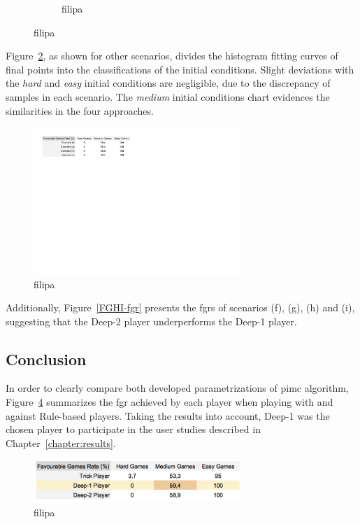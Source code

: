 \begin{figure}[h]
\begin{subfigure}[h]{0.32\textwidth}
                \caption{filipa}
                \label{fig:FGHIeasy}
        \end{subfigure}
        \caption{filipa}
        \label{fig:FGHI-CH}
\end{figure}

Figure~\ref{fig:FGHI-CH}, as shown for other scenarios, divides the histogram fitting curves of final points into the classifications of the initial conditions.
Slight deviations with the \emph{hard} and \emph{easy} initial conditions are negligible, due to the discrepancy of samples in each scenario.
The \emph{medium} initial conditions chart evidences the similarities in the four approaches.

\begin{figure}[h!]
  \centering
    \includegraphics[width=0.7\textwidth]{./img/4/FGHI-fgr}
  \caption{filipa}
\label{fig:FGHI-fgr}
\end{figure}

Additionally, Figure~\ref{FGHI-fgr} presents the \acp{fgr} of scenarios (f), (g), (h) and (i), suggesting that the Deep-2 player underperforms the Deep-1 player.

\subsection{Conclusion}

In order to clearly compare both developed parametrizations of \ac{pimc} algorithm, Figure~\ref{fig:DFH-fgr} summarizes the \ac{fgr} achieved by each player when playing with and against Rule-based players.
Taking the results into account, Deep-1 was the chosen player to participate in the user studies described in Chapter~\ref{chapter:results}.

\begin{figure}[h!]
  \centering
    \includegraphics[width=0.7\textwidth]{./img/4/DFH-fgr}
  \caption{filipa}
\label{fig:DFH-fgr}
\end{figure}
